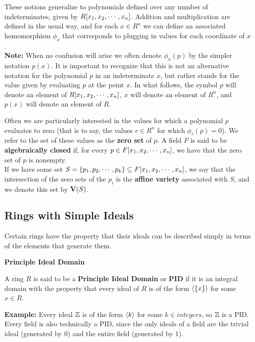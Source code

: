 \documentclass[twoside]{report}
\begin{document}
These notions generalize to polynomials defined over any number of
indeterminates, given by $R[x_1, x_2,\cdots,x_n]$.  Addition and multiplication are
defined in the usual way, and for each $x \in R^n$ we can define an
associated homomorphism $\phi_{x}$ that corresponds to plugging in
values for each coordinate of $x$.\\

\textbf{Note:} When no confusion will arise we often denote
$\phi_x(p)$ by the simpler notation $p(x)$.  It is important to
recognize that this is not an alternative notation for the polynomial
$p$ in an indeterminate $x$, but rather stands for the value given by
evaluating $p$ at the point $x$.  In what follows, the symbol $p$ will
denote an element of $R[x_1, x_2,\cdots,x_n]$, $x$ will denote an element of $R^n$,
and $p(x)$ will denote an element of $R$.

Often we are particularly interested in the values for which a
polynomial $p$ evaluates to zero (that is to say, the values $r \in
R^n$ for which $\phi_r(p) = 0$).  We refer to the set of these values
as the \textbf{zero set} of $p$.  A field $F$ is said to be
\textbf{algebraically closed} if, for every $p \in F[x_1, x_2,\cdots,x_n]$, we have
that the zero set of $p$ is nonempty.\\

If we have some set $S = \{p_1, p_2,\cdots, p_k\} \subseteq
F[x_1, x_2,\cdots,x_n]$, we say that the intersection of the zero sets of the $p_i$
is the \textbf{affine variety} associated with $S$, and we denote this
set by $\mathbf{V}(S)$.

\subsection{Rings with Simple Ideals}

Certain rings have the property that their ideals can be described
simply in terms of the elements that generate them.

\begin{definition} \textbf{Principle Ideal Domain}

  A ring $R$ is said to be a \textbf{Principle Ideal Domain} or
  \textbf{PID} if it is an integral domain with the property that
  every ideal of $R$ is of the form $\langle\{x\}\rangle$ for some $x \in R$.
  
\end{definition}

\textbf{Example:} Every ideal $\mathbb{Z}$ is of the form $\langle k\rangle$
for some $k \in integers$, so $\mathbb{Z}$ is a PID.  Every field is
also technically a PID, since the only ideals of a field are the
trivial ideal (generated by $0$) and the entire field (generated by
$1$).
\end{document}

